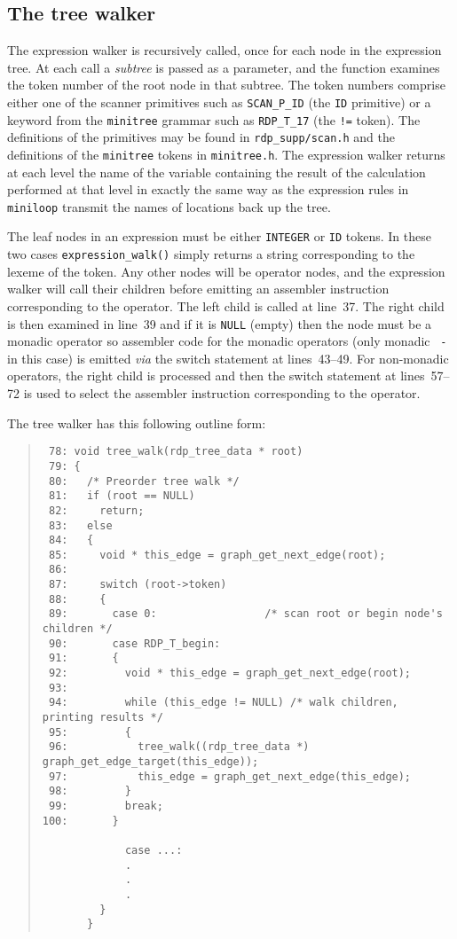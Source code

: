\subsection{The tree walker}

The expression walker is recursively called, once for each node in the
expression tree. At each call a {\em subtree} is passed as a parameter,
and the function examines the token  number of the root node in that
subtree. The token numbers comprise either one of the scanner primitives
such as \verb|SCAN_P_ID| (the {\tt ID} primitive) or a keyword from the
{\tt minitree} grammar such as \verb|RDP_T_17| (the \verb|!=| token).
The definitions of the primitives may be found in \verb|rdp_supp/scan.h|
and the definitions of the {\tt minitree} tokens in \verb|minitree.h|.
The expression walker returns at each level the name of the variable
containing the result of the calculation performed at that level in
exactly the same way as the expression rules in {\tt miniloop} transmit the names
of locations back up the tree.

The leaf nodes in an expression must be either {\tt INTEGER} or {\tt ID}
tokens. In these two cases \verb|expression_walk()| simply returns a
string corresponding to the lexeme of the token. Any other nodes will be
operator nodes, and the expression walker will call their children 
before emitting an assembler instruction corresponding to the operator.
The left child is called at line~37. The right child is then examined in
line~39 and if it is {\tt NULL} (empty) then the node must be a monadic
operator so assembler code for the monadic operators (only monadic {\tt
-} in this case) is emitted {\em via} the switch statement at lines~43--49.
For non-monadic operators, the right child is processed and then the switch
statement at lines~57--72 is used to select the assembler instruction corresponding to
the operator. 

The tree walker has this following outline form:
\begin{quote}
\footnotesize
\begin{verbatim}
 78: void tree_walk(rdp_tree_data * root)
 79: {
 80:   /* Preorder tree walk */
 81:   if (root == NULL)
 82:     return; 
 83:   else
 84:   {
 85:     void * this_edge = graph_get_next_edge(root); 
 86:     
 87:     switch (root->token)
 88:     {
 89:       case 0:                 /* scan root or begin node's children */
 90:       case RDP_T_begin: 
 91:       {
 92:         void * this_edge = graph_get_next_edge(root); 
 93:         
 94:         while (this_edge != NULL) /* walk children, printing results */
 95:         {
 96:           tree_walk((rdp_tree_data *) graph_get_edge_target(this_edge)); 
 97:           this_edge = graph_get_next_edge(this_edge); 
 98:         }
 99:         break; 
100:       }

             case ...:
             .
             .
             .
         }
       } 
\end{verbatim}
\end{quote}

